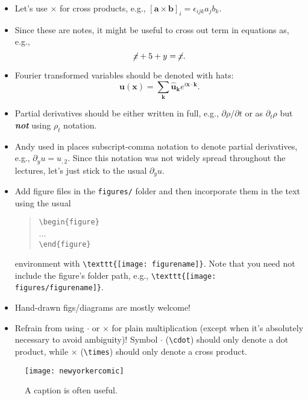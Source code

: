 \begin{itemize}
\item
Let's use $\times$ for cross products, e.g., $[\boldsymbol{a}\times\boldsymbol{b}]_i = \epsilon_{ijk}a_jb_k$.

\item
Since these are notes, it might be useful to cross out term in equations as, e.g., 
\begin{equation}
    \cancel{x} + 5 + y  = \cancel{x}.
\end{equation}

\item
Fourier transformed variables should be denoted with hats:
\begin{equation}
    \boldsymbol{u}(\boldsymbol{x}) = \sum_{\boldsymbol{k}} \hat{\boldsymbol{u}}_{\boldsymbol{k}} e^{i \boldsymbol{x}\cdot\boldsymbol{k}}.
\end{equation}

\item
Partial derivatives should be either written in full, e.g., $\partial\rho/\partial t$ or as $\partial_t\rho$ but \emph{\bf not} using $\rho_t$ notation.

\item
Andy used in places subscript-comma notation to denote partial derivatives, e.g., $\partial_y u = u_{,2}$. Since this notation was not widely spread throughout the lectures, let's just stick to the usual $\partial_y u$.

\item
Add figure files in the \verb"figures/" folder and then incorporate them in the text using the usual 
\begin{quote}
    \verb"\begin{figure}"\\
    ...\\
    \verb"\end{figure}"
\end{quote}
environment with \verb"\texttt{[image: figurename]}". Note that you need not include the figure's folder path, e.g., \verb"\texttt{[image: figures/figurename]}".

\item
Hand-drawn figs/diagrams are mostly welcome!

\item
Refrain from using $\cdot$ or $\times$ for plain multiplication (except when it's absolutely necessary to avoid ambiguity)! Symbol $\cdot$ (\verb"\cdot") should only denote a dot product, while $\times$ (\verb"\times") should only denote a cross product.

\end{itemize}

\begin{figure}[h!]
  \centering
  \texttt{[image: newyorkercomic]}
  \caption{A caption is often useful.}
\end{figure}

